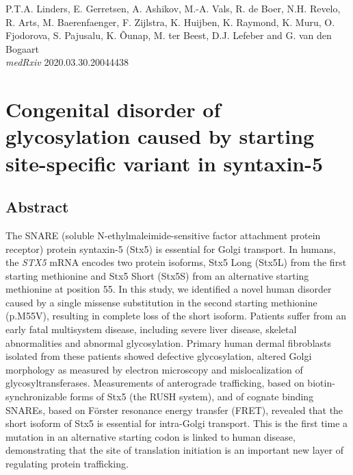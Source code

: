 

\stopthumb




\thispagestyle{empty}
\begin{savequote}
    \normalfont\normalsize{P.T.A. Linders, E. Gerretsen, A. Ashikov, M.-A. Vals, R. de Boer, N.H. Revelo, R. Arts, M. Baerenfaenger, F. Zijlstra, K. Huijben, K. Raymond, K. Muru, O. Fjodorova, S. Pajusalu, K. Õunap, M. ter Beest, D.J. Lefeber and G. van den Bogaart\\
        \emph{medRxiv} 2020.03.30.20044438}
\end{savequote}
\chapter{Congenital disorder of glycosylation caused by starting site-specific variant in syntaxin-5}



\clearpage

\continuethumb
\section{Abstract}

The SNARE (soluble N-ethylmaleimide-sensitive factor attachment protein receptor) protein syntaxin-5 (Stx5) is essential for Golgi transport. In humans, the \emph{STX5} mRNA encodes two protein isoforms, Stx5 Long (Stx5L) from the first starting methionine and Stx5 Short (Stx5S) from an alternative starting methionine at position 55. In this study, we identified a novel human disorder caused by a single missense substitution in the second starting methionine (p.M55V), resulting in complete loss of the short isoform. Patients suffer from an early fatal multisystem disease, including severe liver disease, skeletal abnormalities and abnormal glycosylation. Primary human dermal fibroblasts isolated from these patients showed defective glycosylation, altered Golgi morphology as measured by electron microscopy and mislocalization of glycosyltransferases. Measurements of anterograde trafficking, based on biotin-synchronizable forms of Stx5 (the RUSH system), and of cognate binding SNAREs, based on Förster resonance energy transfer (FRET), revealed that the short isoform of Stx5 is essential for intra-Golgi transport. This is the first time a mutation in an alternative starting codon is linked to human disease, demonstrating that the site of translation initiation is an important new layer of regulating protein trafficking.
\clearpage

